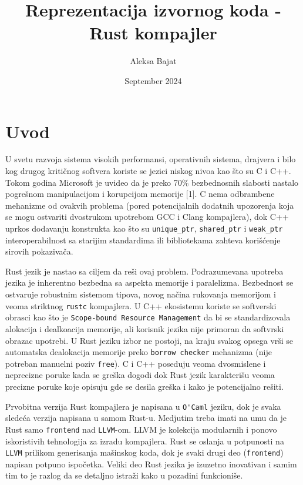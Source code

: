 \documentclass{article}
\title{Reprezentacija izvornog koda - Rust kompajler}
\author{Aleksa Bajat}
\date{September 2024}
\begin{document}
\maketitle
\newpage
\tableofcontents
\newpage

\section{Uvod}

U svetu razvoja sistema visokih performansi, operativnih sistema, drajvera i bilo kog drugog kritičnog softvera koriste se jezici niskog nivoa kao što su C i C++.
Tokom godina Microsoft je uvideo da je preko 70\% bezbednosnih slabosti nastalo pogrešnom manipulacijom i korupcijom memorije [1]. 
C nema odbrambene mehanizme od ovakvih problema (pored potencijalnih dodatnih upozorenja koja se mogu ostvariti dvostrukom upotrebom GCC i Clang kompajlera), dok C++ uprkos dodavanju konstrukta kao što su \verb|unique_ptr|, \verb|shared_ptr| i \verb|weak_ptr| interoperabilnost sa starijim standardima ili bibliotekama zahteva korišćenje sirovih pokazivača. 

Rust jezik je nastao sa ciljem da reši ovaj problem. Podrazumevana upotreba jezika je inherentno bezbedna sa aspekta memorije i paralelizma. Bezbednost se ostvaruje robustnim sistemom tipova, novog načina rukovanja memorijom i veoma striktnog \verb|rustc| kompajlera.
U C++ ekosistemu koriste se softverski obrasci kao što je \verb|Scope-bound Resource Management| da bi se standardizovala alokacija i dealkoacija memorije, ali korisnik jezika nije primoran da softvrski obrazac upotrebi. U Rust jeziku izbor ne postoji, na kraju svakog opsega vrši se automatska dealokacija memorije preko \verb|borrow checker| mehanizma (nije potreban manuelni poziv \verb|free|).
C i C++ poseduju veoma dvosmislene i neprecizne poruke kada se greška dogodi dok Rust jezik karakterišu veoma precizne poruke koje opisuju gde se desila greška i kako je potencijalno rešiti.

Prvobitna verzija Rust kompajlera je napisana u \verb|O'Caml| jeziku, dok je svaka sledeća verzija napisana u samom Rust-u.
Medjutim treba imati na umu da je Rust samo \verb|frontend| nad \verb|LLVM|-om. LLVM je kolekcija modularnih i ponovo iskoristivih tehnologija za izradu kompajlera. Rust se oslanja u potpunosti na \verb|LLVM| prilikom generisanja mašinskog koda, dok je svaki drugi deo
(\verb|frontend|) napisan potpuno ispočetka.
Veliki deo Rust jezika je izuzetno inovativan i samim tim to je razlog da se detaljno istraži kako u pozadini funkcioniše.
\end{document}
